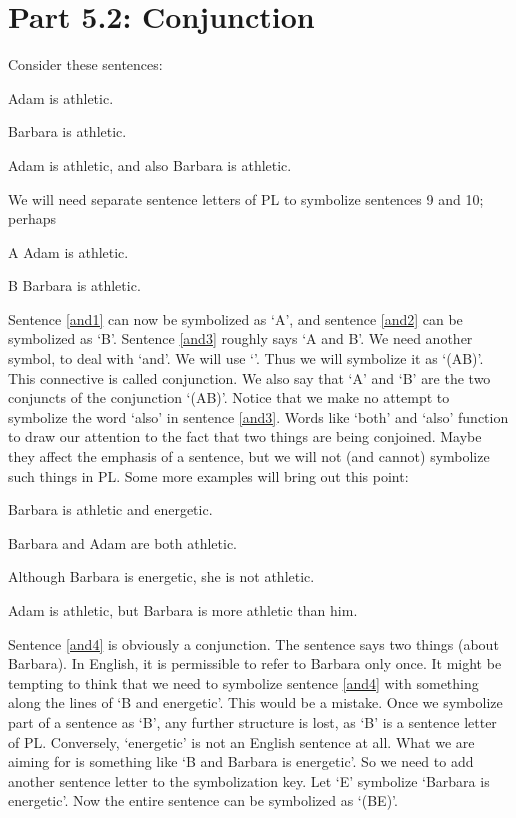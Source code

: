 \section{Part 5.2: Conjunction}
\label{s:Part 5.2: Conjunction}
Consider these sentences:
	\begin{earg}
		\item[\ex{and1}]Adam is athletic.
		\item[\ex{and2}]Barbara is athletic.
		\item[\ex{and3}]Adam is athletic, and also Barbara is athletic.
	\end{earg}
We will need separate sentence letters of PL to symbolize sentences 9 and 10; perhaps
	\begin{ekey}
		\item[A] Adam is athletic.
		\item[B] Barbara is athletic.
	\end{ekey}
Sentence \ref{and1} can now be symbolized as ‘A’, and sentence \ref{and2} can be symbolized as ‘B’. Sentence \ref{and3} roughly says ‘A and B’. We need another symbol, to deal with ‘and’. We will use ‘\eand’. Thus we will symbolize it as ‘(A\eand B)’. This connective is called \gls{conjunction}. We also say that ‘A’ and ‘B’ are the two \glspl{conjunct} of the conjunction ‘(A\eand B)’.
Notice that we make no attempt to symbolize the word ‘also’ in sentence  \ref{and3}. Words like ‘both’ and ‘also’ function to draw our attention to the fact that two things are being conjoined. Maybe they affect the emphasis of a sentence, but we will not (and cannot) symbolize such things in PL.
Some more examples will bring out this point:
	\begin{earg}
		\item[\ex{and4}]Barbara is athletic and energetic.
		\item[\ex{and5}]Barbara and Adam are both athletic.
		\item[\ex{and6}]Although Barbara is energetic, she is not athletic.
		\item[\ex{and7}]Adam is athletic, but Barbara is more athletic than him.
	\end{earg}
Sentence \ref{and4} is obviously a conjunction. The sentence says two things (about Barbara). In English, it is permissible to refer to Barbara only once. It might be tempting to think that we need to symbolize sentence \ref{and4} with something along the lines of ‘B and energetic’. This would be a mistake. Once we symbolize part of a sentence as ‘B’, any further structure is lost, as ‘B’ is a sentence letter of PL. Conversely, ‘energetic’ is not an English sentence at all. What we are aiming for is something like ‘B and Barbara is energetic’. So we need to add another sentence letter to the symbolization key. Let ‘E’ symbolize ‘Barbara is energetic’. Now the entire sentence can be symbolized as ‘(B\eand E)’.

